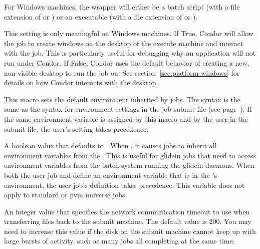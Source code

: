 \begin{description}
  For Windows machines, the wrapper will either be
  a batch script (with a file extension of  or )
  or an executable (with a file extension of  or ).

\item[\Macro{USE\_VISIBLE\_DESKTOP}] \label{param:UseVisibleDesktop} 
  This setting is only meaningful on Windows machines.  If True, Condor will
  allow the job to create windows on the desktop of the execute machine and
  interact with the job.  This is particularly useful for debugging why an
  application will not run under Condor.  If False, Condor uses the default
  behavior of creating a new, non-visible desktop to run the job on.
  See section~\ref{sec:platform-windows} for details on how Condor 
  interacts with the desktop.

\item[\Macro{STARTER\_JOB\_ENVIRONMENT}] \label{param:StarterJobEnvironment}
  This macro sets the default environment inherited by jobs.  The syntax is
  the same as the syntax for environment settings in the job submit file
  (see page~\pageref{man-condor-submit-environment}).
  If the same environment variable is assigned by this macro and by the user
  in the submit file, the user's setting takes precedence.

\item[\Macro{JOB\_INHERITS\_STARTER\_ENVIRONMENT}]
\label{param:JobInheritsStarterEnvironment} 
A boolean value that defaults to .
When ,
it causes jobs to inherit all environment variables from 
the .
This is useful for glidein jobs that need to
access environment variables from the batch system running the glidein
daemons.
When both the user job and  define
an environment variable that is in the 's
environment, the user job's definition takes precedence.
This variable does not apply to standard or pvm universe jobs.

\item[\Macro{STARTER\_UPLOAD\_TIMEOUT}]
\label{param:StarterUploadTimeout} 
An integer value that specifies the network communication timeout to use
when transferring files back to the submit machine.  The default value is
200.  You may need to increase this value if the disk on the submit machine
cannot keep up with large bursts of activity, such as many jobs all
completing at the same time.

\end{description}

